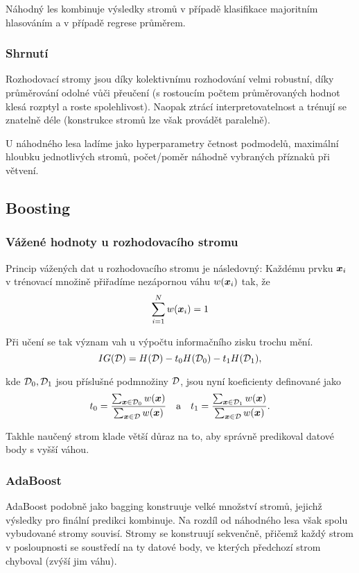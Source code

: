 Náhodný les kombinuje výsledky stromů v případě klasifikace majoritním hlasováním a v případě regrese průměrem.

\subsubsection{Shrnutí}

Rozhodovací stromy jsou díky kolektivnímu rozhodování velmi robustní, díky průměrování odolné vůči přeučení (s rostoucím počtem průměrovaných hodnot klesá rozptyl a roste spolehlivost). Naopak ztrácí interpretovatelnost a trénují se znatelně déle (konstrukce stromů lze však provádět paralelně).

U náhodného lesa ladíme jako hyperparametry četnost podmodelů, maximální hloubku jednotlivých stromů, počet/poměr náhodně vybraných příznaků při větvení.

\subsection{Boosting}

\subsubsection{Vážené hodnoty u rozhodovacího stromu}

Princip vážených dat u rozhodovacího stromu je následovný: Každému prvku $\bm{x}_i$ v trénovací množině přiřadíme nezápornou váhu $w(\bm{x}_i)$ tak, že \[\sum_{i=1}^{N} w(\bm{x}_i) = 1\]

Při učení se tak význam vah u výpočtu informačního zisku trochu mění.
\[
    IG(\mathcal{D}) = H(\mathcal{D}) - t_0 H(\mathcal{D}_0) - t_1 H(\mathcal{D}_1),
\]

kde $\mathcal{D}_0, \mathcal{D}_1$ jsou příslušné podmnožiny $\mathcal{D}$, jsou nyní koeficienty definované jako
\begin{equation*}
    t_0 = \frac{\sum_{\bm{x} \in \mathcal{D}_0} w(\bm{x})}{\sum_{\bm{x} \in \mathcal{D}} w(\bm{x})}
    \quad \text{a} \quad
    t_1 = \frac{\sum_{\bm{x} \in \mathcal{D}_1} w(\bm{x})}{\sum_{\bm{x} \in \mathcal{D}} w(\bm{x})}.
\end{equation*}

Takhle naučený strom klade větší důraz na to, aby správně predikoval datové body s vyšší váhou.

\subsubsection{AdaBoost}

AdaBoost podobně jako bagging konstruuje velké množství stromů, jejichž výsledky pro finální predikci kombinuje. Na rozdíl od náhodného lesa však spolu vybudované stromy souvisí. Stromy se konstruují sekvenčně, přičemž každý strom v posloupnosti se soustředí na ty datové body, ve kterých předchozí strom chyboval (zvýší jim váhu).

